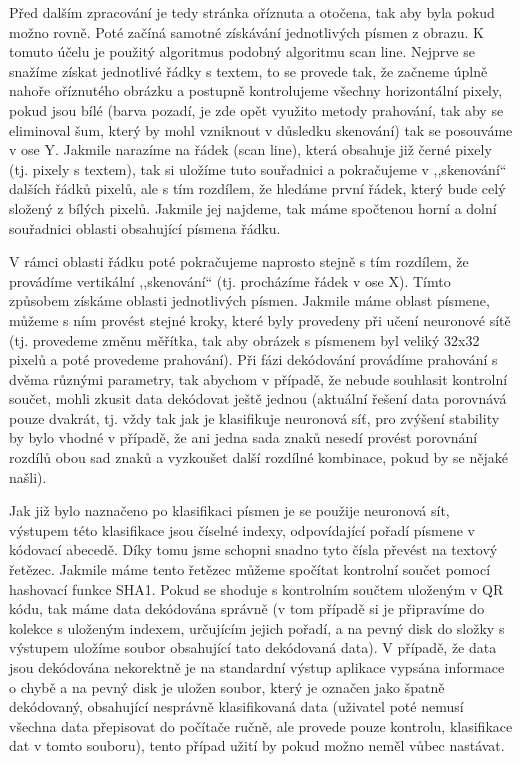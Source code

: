 \documentclass[conference]{IEEEtran}
\begin{document}
Před dalším zpracování je tedy stránka oříznuta a otočena, tak aby byla pokud možno rovně. Poté začíná samotné získávání jednotlivých písmen z obrazu. K tomuto účelu je použitý algoritmus podobný algoritmu scan line. Nejprve se snažíme získat jednotlivé řádky s textem, to se provede tak, že začneme úplně nahoře oříznutého obrázku a postupně kontrolujeme všechny horizontální pixely, pokud jsou bílé (barva pozadí, je zde opět využito metody prahování, tak aby se eliminoval šum, který by mohl vzniknout v důsledku skenování) tak se posouváme v ose Y. Jakmile narazíme na řádek (scan line), která obsahuje již černé pixely (tj. pixely s textem), tak si uložíme tuto souřadnici a pokračujeme v ,,skenování`` dalších řádků pixelů, ale s tím rozdílem, že hledáme první řádek, který bude celý složený z bílých pixelů. Jakmile jej najdeme, tak máme spočtenou horní a dolní souřadnici oblasti obsahující písmena řádku.

V rámci oblasti řádku poté pokračujeme naprosto stejně s tím rozdílem, že provádíme vertikální ,,skenování`` (tj. procházíme řádek v ose X). Tímto způsobem získáme oblasti jednotlivých písmen. Jakmile máme oblast písmene, můžeme s ním provést stejné kroky, které byly provedeny při učení neuronové sítě (tj. provedeme změnu měřítka, tak aby obrázek s písmenem byl veliký 32x32 pixelů a poté provedeme prahování). Při fázi dekódování provádíme prahování s dvěma různými parametry, tak abychom v případě, že nebude souhlasit kontrolní součet, mohli zkusit data dekódovat ještě jednou (aktuální řešení data porovnává pouze dvakrát, tj. vždy tak jak je klasifikuje neuronová síť, pro zvýšení stability by bylo vhodné v případě, že ani jedna sada znaků nesedí provést porovnání rozdílů obou sad znaků a vyzkoušet další rozdílné kombinace, pokud by se nějaké našli). 

Jak již bylo naznačeno po klasifikaci písmen je se použije neuronová sít, výstupem této klasifikace jsou číselné indexy, odpovídající pořadí písmene v kódovací abecedě. Díky tomu jsme schopni snadno tyto čísla převést na textový řetězec. Jakmile máme tento řetězec můžeme spočítat kontrolní součet pomocí hashovací funkce SHA1. Pokud se shoduje s kontrolním součtem uloženým v QR kódu, tak máme data dekódována správně (v tom případě si je připravíme do kolekce s uloženým indexem, určujícím jejich pořadí, a na pevný disk do složky s výstupem uložíme soubor obsahující tato dekódovaná data). V případě, že data jsou dekódována nekorektně je na standardní výstup aplikace vypsána informace o chybě a na pevný disk je uložen soubor, který je označen jako špatně dekódovaný, obsahující nesprávně klasifikovaná data (uživatel poté nemusí všechna data přepisovat do počítače ručně, ale provede pouze kontrolu, klasifikace dat v tomto souboru), tento případ užití by pokud možno neměl vůbec nastávat.
\end{document}
